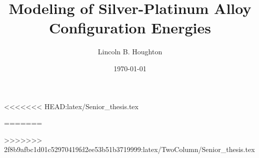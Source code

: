 \documentclass[aps,twocolumn,amsfonts,letterpaper]{revtex4-1}
\begin{document}
\title{Modeling of Silver-Platinum Alloy Configuration Energies}
\author{Lincoln B. Houghton}
\date{\today}

\maketitle






 







%
%
<<<<<<< HEAD:latex/Senior_thesis.tex

=======

>>>>>>> 2f8b9afbc1d01c52970419fd2ee53b51b3719999:latex/TwoColumn/Senior_thesis.tex

\end{document}
